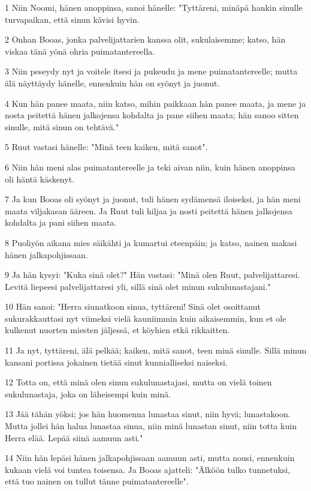 \par 1 Niin Noomi, hänen anoppinsa, sanoi hänelle: "Tyttäreni, minäpä hankin sinulle turvapaikan, että sinun kävisi hyvin.
\par 2 Onhan Booas, jonka palvelijattarien kanssa olit, sukulaisemme; katso, hän viskaa tänä yönä ohria puimatantereella.
\par 3 Niin peseydy nyt ja voitele itsesi ja pukeudu ja mene puimatantereelle; mutta älä näyttäydy hänelle, ennenkuin hän on syönyt ja juonut.
\par 4 Kun hän panee maata, niin katso, mihin paikkaan hän panee maata, ja mene ja nosta peitettä hänen jalkojensa kohdalta ja pane siihen maata; hän sanoo sitten sinulle, mitä sinun on tehtävä."
\par 5 Ruut vastasi hänelle: "Minä teen kaiken, mitä sanot".
\par 6 Niin hän meni alas puimatantereelle ja teki aivan niin, kuin hänen anoppinsa oli häntä käskenyt.
\par 7 Ja kun Booas oli syönyt ja juonut, tuli hänen sydämensä iloiseksi, ja hän meni maata viljakasan ääreen. Ja Ruut tuli hiljaa ja nosti peitettä hänen jalkojensa kohdalta ja pani siihen maata.
\par 8 Puoliyön aikana mies säikähti ja kumartui eteenpäin; ja katso, nainen makasi hänen jalkapohjissaan.
\par 9 Ja hän kysyi: "Kuka sinä olet?" Hän vastasi: "Minä olen Ruut, palvelijattaresi. Levitä liepeesi palvelijattaresi yli, sillä sinä olet minun sukulunastajani."
\par 10 Hän sanoi: "Herra siunatkoon sinua, tyttäreni! Sinä olet osoittanut sukurakkauttasi nyt viimeksi vielä kauniimmin kuin aikaisemmin, kun et ole kulkenut nuorten miesten jäljessä, et köyhien etkä rikkaitten.
\par 11 Ja nyt, tyttäreni, älä pelkää; kaiken, mitä sanot, teen minä sinulle. Sillä minun kansani portissa jokainen tietää sinut kunnialliseksi naiseksi.
\par 12 Totta on, että minä olen sinun sukulunastajasi, mutta on vielä toinen sukulunastaja, joka on läheisempi kuin minä.
\par 13 Jää tähän yöksi; jos hän huomenna lunastaa sinut, niin hyvä; lunastakoon. Mutta jollei hän halua lunastaa sinua, niin minä lunastan sinut, niin totta kuin Herra elää. Lepää siinä aamuun asti."
\par 14 Niin hän lepäsi hänen jalkapohjissaan aamuun asti, mutta nousi, ennenkuin kukaan vielä voi tuntea toisensa. Ja Booas ajatteli: "Älköön tulko tunnetuksi, että tuo nainen on tullut tänne puimatantereelle".
